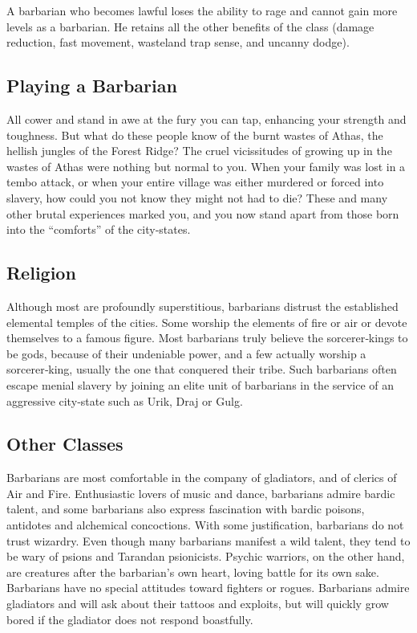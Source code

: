 \documentclass[10pt,a4paper,twocolumn]{d20}
\begin{document}
{A barbarian who becomes lawful loses the ability to rage and cannot gain more levels as a barbarian. He retains all the other benefits of the class (damage reduction, fast movement, wasteland trap sense, and uncanny dodge).

\subsection{Playing a Barbarian}

All cower and stand in awe at the fury you can tap, enhancing your strength and toughness. But what do these people know of the burnt wastes of Athas, the hellish jungles of the Forest Ridge? The cruel vicissitudes of growing up in the wastes of Athas were nothing but normal to you. When your family was lost in a tembo attack, or when your entire village was either murdered or forced into slavery, how could you not know they might not had to die? These and many other brutal experiences marked you, and you now stand apart from those born into the “comforts” of the city‐states.

\subsection{Religion}

Although most are profoundly superstitious, barbarians distrust the established elemental temples of the cities. Some worship the elements of fire or air or devote themselves to a famous figure. Most barbarians truly believe the sorcerer‐kings to be gods, because of their undeniable power, and a few actually worship a sorcerer‐king, usually the one that conquered their tribe. Such barbarians often escape menial slavery by joining an elite unit of barbarians in the service of an aggressive city‐state such as Urik, Draj or Gulg.

\subsection{Other Classes}

Barbarians are most comfortable in the company of gladiators, and of clerics of Air and Fire. Enthusiastic lovers of music and dance, barbarians admire bardic talent, and some barbarians also express fascination with bardic poisons, antidotes and alchemical concoctions. With some justification, barbarians do not trust wizardry. Even though many barbarians manifest a wild talent, they tend to be wary of psions and Tarandan psionicists. Psychic warriors, on the other hand, are creatures after the barbarian’s own heart, loving battle for its own sake. Barbarians have no special attitudes toward fighters or rogues. Barbarians admire gladiators and will ask about their tattoos and exploits, but will quickly grow bored if the gladiator does not respond boastfully.

}
\end{document}
